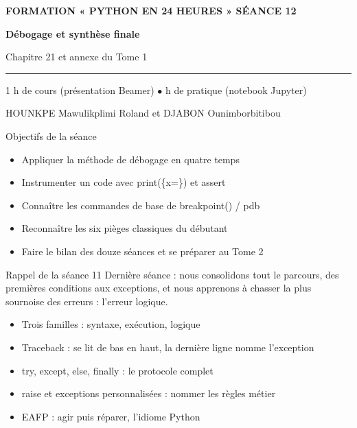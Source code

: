 \documentclass[aspectratio=169,11pt]{beamer}
\begin{document}
{%
\begin{frame}[plain]
\vspace{10mm}
{\color{PyJaune}\small\bfseries FORMATION « PYTHON EN 24 HEURES » \quad\textbar\quad SÉANCE 12\par}
\vspace{4mm}
{\color{white}\Huge\bfseries Débogage et synthèse finale\par}
\vspace{4mm}
{\color{PyBleuClair}\large Chapitre 21 et annexe du Tome 1\par}
\vspace{7mm}
{\color{PyJaune}\rule{34mm}{2.2pt}\par}
\vspace{7mm}
{\color{white}\normalsize 1 h de cours (présentation Beamer) \quad$\bullet$ h de pratique (notebook Jupyter)\par}
\vspace{2.5mm}
{\color{PyBleuClair}\normalsize HOUNKPE Mawulikplimi Roland et DJABON Ounimborbitibou\par}
\end{frame}
}
\begin{frame}{Objectifs de la séance}
\begin{itemize}
  \item Appliquer la méthode de débogage en quatre temps
  \item Instrumenter un code avec print(\{x=\}) et assert
  \item Connaître les commandes de base de breakpoint() / pdb
  \item Reconnaître les six pièges classiques du débutant
  \item Faire le bilan des douze séances et se préparer au Tome 2
\end{itemize}
\end{frame}
\begin{frame}{Rappel de la séance 11}
Dernière séance : nous consolidons tout le parcours, des premières conditions aux exceptions, et nous apprenons à chasser la plus sournoise des erreurs : l'erreur logique.

\begin{itemize}
  \item Trois familles : syntaxe, exécution, logique
  \item Traceback : se lit de bas en haut, la dernière ligne nomme l'exception
  \item try, except, else, finally : le protocole complet
  \item raise et exceptions personnalisées : nommer les règles métier
  \item EAFP : agir puis réparer, l'idiome Python
\end{itemize}
\end{frame}
\end{document}
